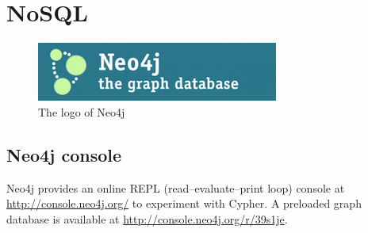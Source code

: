 \documentclass[]{report}
\let\Oldincludegraphics\includegraphics
\renewcommand{\includegraphics}[1]{
\begin{adjustbox}{max size={\textwidth}{\textheight}}
    \Oldincludegraphics[scale=0.6]{#1}%
\end{adjustbox}
}
\begin{document}
\chapter{NoSQL}

\begin{figure}[htbp]
\centering
\includegraphics{img/nosql/neo4j_logo.png}
\caption{The logo of Neo4j}
\end{figure}

\section{Neo4j console}

Neo4j provides an online REPL (read--evaluate--print loop) console at
\url{http://console.neo4j.org/} to experiment with Cypher. A preloaded
graph database is available at \url{http://console.neo4j.org/r/39s1je}.
\end{document}
